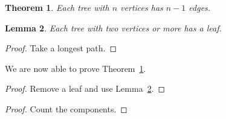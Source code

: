 \documentclass{amsart}
\newtheorem{thm}{Theorem}
\newtheorem{lem}[thm]{Lemma}
\newcommand{\thref}[1]{Theorem~\ref{#1}}
\begin{document}
\begin{thm}\label{main} Each tree with $n$ vertices has $n-1$ edges. \end{thm}
\begin{lem}\label{aux} Each tree with two vertices or more has a leaf. \end{lem}
\begin{proof} Take a longest path. \end{proof}

We are now able to prove Theorem~\ref{main}.

\begin{proof} Remove a leaf and use Lemma~\ref{aux}. \end{proof}

\renewcommand{\proofname}{Proof of \thref{main}}
\begin{proof} Count the components. \end{proof}
\end{document}
